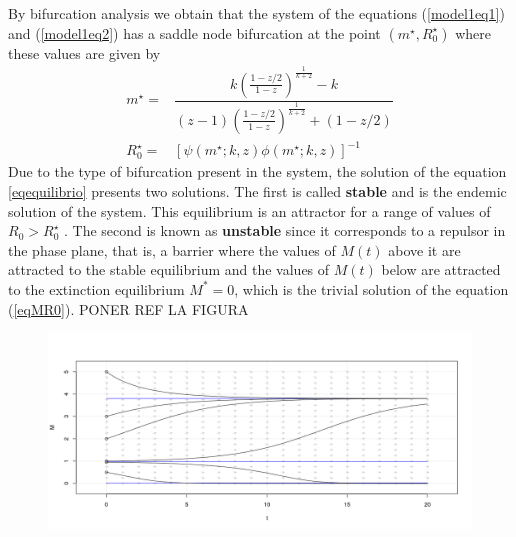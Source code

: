 \documentclass[12pt,a4paper]{article}
\theoremstyle{plain}%
\theoremstyle{definition}
\theoremstyle{remark}
\begin{document}
	By bifurcation analysis we obtain that the system of the  equations (\ref{model1eq1}) and (\ref{model1eq2}) has a saddle node bifurcation at the point $(m^\star,R_0^\star)$ where these values are given by
	\begin{equation}
	\begin{split}
	m^\star=&\dfrac{k\left( \frac{1-z/2}{1-z}\right)^{\frac{1}{k+2}} - k}{(z-1)\left( \frac{1-z/2}{1-z}\right)^{\frac{1}{k+2}} + (1-z/2)}\\
	R_0^\star=&\left[ \psi(m^\star;k,z)\phi(m^\star;k,z)\right]^{-1}
	\end{split}	
	\end{equation}
	Due to the type of bifurcation present in the system, the solution of the equation \eqref{eqequilibrio} presents two solutions. 
	The first is called \textbf{stable} and is the endemic solution of the system.
	This equilibrium is an attractor for a range of values of $R_0> R_0 ^\star$ .
	The second is known as \textbf{unstable} since it corresponds to a repulsor in the phase plane, that is, a barrier where the values of $M(t)$ above it are attracted to the stable equilibrium and the values of $M(t)$ below are attracted to the extinction equilibrium $M^*= 0$, which is the trivial solution of the equation (\ref{eqMR0}).
	{\color{red} PONER REF LA FIGURA
	}
	\begin{figure}
		\centering
		\includegraphics[width=0.99\linewidth]{planophase}
		\caption{}
		\label{f:phase}
	\end{figure}
\end{document}
